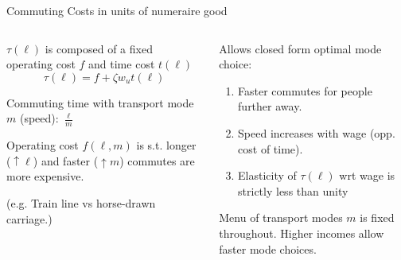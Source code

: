 \documentclass[aspectratio=169]{beamer}
\begin{document}
\begin{frame}{Commuting Costs in units of numeraire good}

\begin{columns}
\begin{column}{0.5\textwidth}
\begin{midi}
\item $\tau(\ell)$ is composed of a fixed operating cost $f$ and time cost $t(\ell)$
\begin{equation*}
\tau(\ell) = f + \zeta w_u t(\ell)
\end{equation*}
\item Commuting time with transport mode $m$ (speed): $\frac{\ell}{m}$
\item Operating cost $f(\ell,m)$ is s.t. longer ($\uparrow \ell$) and faster ($\uparrow m$) commutes are more expensive.
\item (e.g. Train line vs horse-drawn carriage.)
\end{midi}
\end{column}
\pause
\begin{column}{0.5\textwidth}
\begin{midi}
\item Allows closed form optimal mode choice:
\begin{enumerate}
\item Faster commutes for people further away.
\item Speed increases with wage (opp. cost of time).
\item Elasticity of $\tau(\ell)$ wrt wage is strictly less than unity%
\end{enumerate}
\item Menu of transport modes $m$ is fixed throughout. Higher incomes allow faster mode choices.
\end{midi}

\end{column}
\end{columns}

\end{frame}
\end{document}
